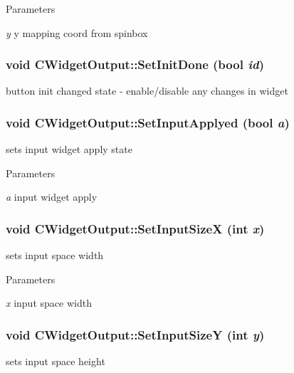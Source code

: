\begin{DoxyParams}{Parameters}
\item[{\em y}]y mapping coord from spinbox \end{DoxyParams}
\hypertarget{classCWidgetOutput_a517c98711eaa20bb3a370181fe1b0b86}{
\subsubsection[{SetInitDone}]{\setlength{\rightskip}{0pt plus 5cm}void CWidgetOutput::SetInitDone (bool {\em id})}}
\label{classCWidgetOutput_a517c98711eaa20bb3a370181fe1b0b86}
button init changed state -\/ enable/disable any changes in widget \hypertarget{classCWidgetOutput_a9c4fe2d7649b6c5273df945f69cbec22}{
\subsubsection[{SetInputApplyed}]{\setlength{\rightskip}{0pt plus 5cm}void CWidgetOutput::SetInputApplyed (bool {\em a})}}
\label{classCWidgetOutput_a9c4fe2d7649b6c5273df945f69cbec22}
sets input widget apply state


\begin{DoxyParams}{Parameters}
\item[{\em a}]input widget apply \end{DoxyParams}
\hypertarget{classCWidgetOutput_a50817d0767670f5ddf46585de5892d26}{
\subsubsection[{SetInputSizeX}]{\setlength{\rightskip}{0pt plus 5cm}void CWidgetOutput::SetInputSizeX (int {\em x})}}
\label{classCWidgetOutput_a50817d0767670f5ddf46585de5892d26}
sets input space width


\begin{DoxyParams}{Parameters}
\item[{\em x}]input space width \end{DoxyParams}
\hypertarget{classCWidgetOutput_a71c98ee451faa09a9c53842aaae70aca}{
\subsubsection[{SetInputSizeY}]{\setlength{\rightskip}{0pt plus 5cm}void CWidgetOutput::SetInputSizeY (int {\em y})}}
\label{classCWidgetOutput_a71c98ee451faa09a9c53842aaae70aca}
sets input space height


